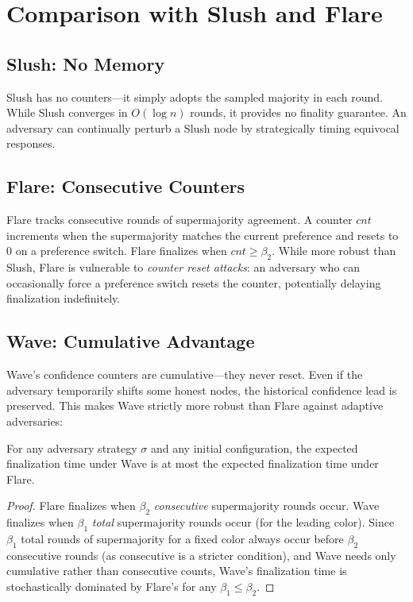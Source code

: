 \section{Comparison with Slush and Flare}

\label{sec:comparison}

\subsection{Slush: No Memory}

Slush has no counters---it simply adopts the sampled majority in each round. While Slush
converges in $O(\log n)$ rounds, it provides no finality guarantee. An adversary can
continually perturb a Slush node by strategically timing equivocal responses.

\subsection{Flare: Consecutive Counters}

Flare tracks consecutive rounds of supermajority agreement. A counter $cnt$ increments
when the supermajority matches the current preference and resets to 0 on a preference
switch. Flare finalizes when $cnt \geq \beta_2$. While more robust than Slush, Flare
is vulnerable to \emph{counter reset attacks}: an adversary who can occasionally force
a preference switch resets the counter, potentially delaying finalization indefinitely.

\subsection{Wave: Cumulative Advantage}

Wave's confidence counters are cumulative---they never reset. Even if the adversary
temporarily shifts some honest nodes, the historical confidence lead is preserved.
This makes Wave strictly more robust than Flare against adaptive adversaries:

\begin{proposition}
\label{prop:dominance}
For any adversary strategy $\sigma$ and any initial configuration, the expected
finalization time under Wave is at most the expected finalization time under Flare.
\end{proposition}

\begin{proof}
Flare finalizes when $\beta_2$ \emph{consecutive} supermajority rounds occur. Wave
finalizes when $\beta_1$ \emph{total} supermajority rounds occur (for the leading color).
Since $\beta_1$ total rounds of supermajority for a fixed color always occur before
$\beta_2$ consecutive rounds (as consecutive is a stricter condition), and Wave needs
only cumulative rather than consecutive counts, Wave's finalization time is stochastically
dominated by Flare's for any $\beta_1 \leq \beta_2$.
\end{proof}

